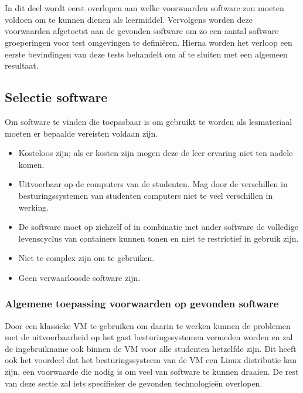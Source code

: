 
\chapter{}
\label{ch:methodologie}
In dit deel wordt eerst overlopen aan welke voorwaarden software zou moeten voldoen om te kunnen dienen als leermiddel. Vervolgens worden deze voorwaarden afgetoetst aan de gevonden software om zo een aantal software groeperingen voor test omgevingen te definiëren. Hierna worden het verloop een eerste bevindingen van deze tests behandelt om af te sluiten met een algemeen resultaat.


\section{Selectie software}
Om software te vinden die toepasbaar is om gebruikt te worden als lesmateriaal moeten er bepaalde vereisten voldaan zijn.

\begin{itemize}
    \item Kosteloos zijn; als er kosten zijn mogen deze de leer ervaring niet ten nadele komen.
    \item Uitvoerbaar op de computers van de studenten. Mag door de verschillen in besturingssystemen van studenten computers niet te veel verschillen in werking.
    \item De software moet op zichzelf of in combinatie met ander software de volledige levenscyclus van containers kunnen tonen en niet te restrictief in gebruik zijn.
    \item Niet te complex zijn om te gebruiken.
    \item Geen verwaarloosde software zijn.
\end{itemize}
    
\subsection{Algemene toepassing voorwaarden op gevonden software}
Door een klassieke VM te gebruiken om daarin te werken kunnen de problemen met de uitvoerbaarheid op het gast besturingssystemen vermeden worden en zal de ingebruikname ook binnen de VM voor alle studenten hetzelfde zijn. Dit heeft ook het voordeel dat het besturingssysteem van de VM een Linux distributie kan zijn, een voorwaarde die nodig is om veel van software te kunnen draaien. De rest van deze sectie zal iets specifieker de gevonden technologieën overlopen.

